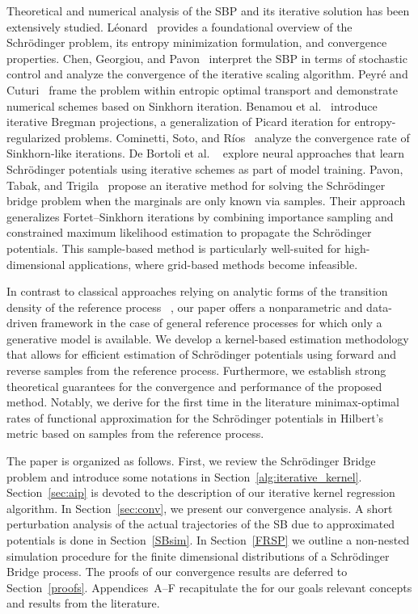 \documentclass[a4paper,11pt]{amsart}
\theoremstyle{plain}
\theoremstyle{remark}
\begin{document}
Theoretical and numerical analysis of the SBP and its iterative solution has been extensively studied. L\'eonard~\cite{leonard2013survey} provides a foundational overview of the Schr\"odinger problem, its entropy minimization formulation, and convergence properties. Chen, Georgiou, and Pavon~ \cite{chen2016entropic} interpret the SBP in terms of stochastic control and analyze the convergence of the iterative scaling algorithm. Peyr\'e and Cuturi~ \cite{peyre2019computational} frame the problem within entropic optimal transport and demonstrate numerical schemes based on Sinkhorn iteration. Benamou et al.~\cite{benamou2015iterative} introduce iterative Bregman projections, a generalization of Picard iteration for entropy-regularized problems. Cominetti, Soto, and R\'ios~\cite{cominetti2021rate} analyze the convergence rate of Sinkhorn-like iterations. De Bortoli et al. ~\cite{debortoli2021neurips} explore neural approaches that learn Schr\"odinger potentials using iterative schemes as part of model training. Pavon, Tabak, and Trigila~\cite{pavon2018data} propose an iterative method for solving the Schr\"odinger bridge problem when the marginals are only known via samples. Their approach generalizes Fortet--Sinkhorn iterations by combining importance sampling and constrained maximum likelihood estimation to propagate the Schr\"odinger potentials. This sample-based method is particularly well-suited for high-dimensional applications, where grid-based methods become infeasible. 
\par
In contrast to classical approaches relying on analytic forms of the transition density of the reference process ~\cite{leonard2013survey, chen2016entropic, benamou2015iterative}, our paper offers a nonparametric and data-driven framework in the case of general reference processes for which only a generative model is available. We develop a kernel-based estimation methodology  that allows for efficient estimation of Schr\"odinger potentials using forward and reverse samples from the reference process. Furthermore, we establish strong theoretical guarantees for the convergence and performance of the proposed method. Notably, we derive for the first time in the literature minimax-optimal rates of functional approximation for the Schr\"odinger potentials in Hilbert's metric based  on samples from the reference process.
\par
The paper is organized as follows. First, we review the Schr\"odinger Bridge problem and introduce some notations in Section~\ref{alg:iterative_kernel}. Section~\ref{sec:aip} is devoted to the description of our iterative  kernel  regression algorithm. In Section~\ref{sec:conv}, we present our convergence analysis.
A short perturbation analysis of the actual trajectories of the SB due to approximated potentials is done in Section~\ref{SBsim}.
In Section~\ref{FRSP} we outline a non-nested simulation procedure for the finite dimensional distributions of a  Schr\"odinger Bridge process. 
The proofs of our convergence results are deferred to Section~\ref{proofs}. Appendices~A--F  
recapitulate the for our goals relevant concepts and results from the literature.
\end{document}
